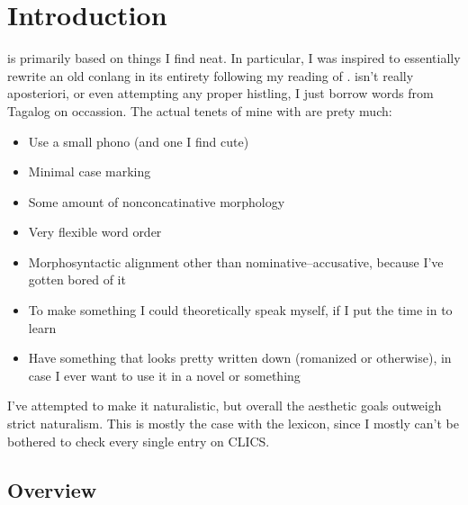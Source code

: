 \chapter{Introduction}
\langname{} is primarily based on things I find neat. In particular, I was inspired to essentially rewrite an old conlang in its entirety following my reading of \cite{Otanes72}. \langname{} isn't really aposteriori, or even attempting any proper histling, I just borrow words from Tagalog on occassion. The actual tenets of mine with \langname{} are prety much:

\begin{itemize}
  \item Use a small phono (and one I find cute)
  \item Minimal case marking
  \item Some amount of nonconcatinative morphology
  \item Very flexible word order
  \item Morphosyntactic alignment other than nominative--accusative, because I've gotten bored of it
  \item To make something I could theoretically speak myself, if I put the time in to learn
  \item Have something that looks pretty written down (romanized or otherwise), in case I ever want to use it in a novel or something
\end{itemize}

I've attempted to make it naturalistic, but overall the aesthetic goals outweigh strict naturalism. This is mostly the case with the lexicon, since I mostly can't be bothered to check every single entry on CLICS.

\section{Overview}